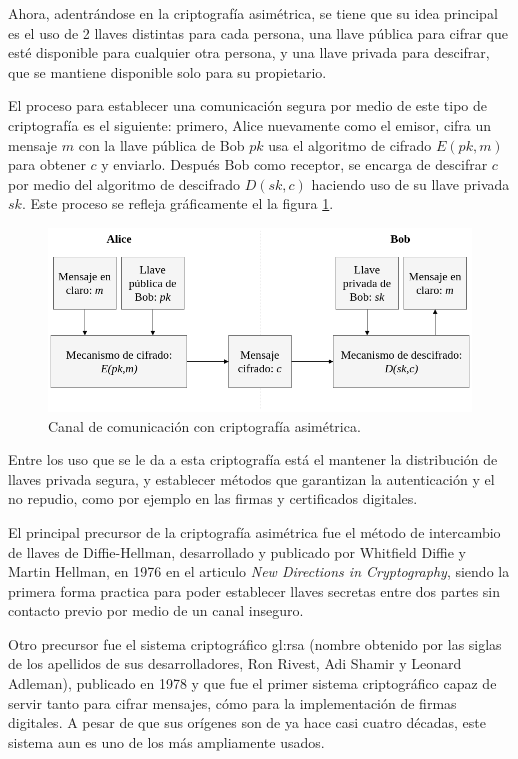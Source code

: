   Ahora, adentrándose en la criptografía asimétrica, se tiene que su idea
  principal es el uso de 2 llaves distintas para cada persona, una llave
  pública para cifrar que esté disponible para cualquier otra persona, y una
  llave privada para descifrar, que se mantiene disponible solo para su
  propietario.

  El proceso para establecer una comunicación segura por medio de este tipo
  de criptografía es el siguiente: primero, Alice nuevamente como el emisor,
  cifra un mensaje $m$ con la llave pública de Bob $pk$ usa el algoritmo de
  cifrado $E(pk,m)$ para obtener $c$ y enviarlo. Después Bob como receptor,
  se encarga de descifrar $c$ por medio del algoritmo de descifrado
  $D(sk,c)$ haciendo uso de su llave privada $sk$. Este proceso se refleja
  gráficamente el la figura \ref{cripto_asimetrica}.

  \begin{figure}[H]
    \begin{center}
      \includegraphics[width=0.8\linewidth]
        {contenidos/antecedentes/intro/img/cripto_asimetrica.png}
      \caption{Canal de comunicación con criptografía asimétrica.}
      \label{cripto_asimetrica}
    \end{center}
  \end{figure}

  Entre los uso que se le da a esta criptografía está el mantener la
  distribución de llaves privada segura, y establecer métodos que garantizan
  la autenticación y el no repudio, como por ejemplo en las firmas y
  certificados digitales.

  El principal precursor de la criptografía asimétrica fue el método de 
  intercambio de llaves de Diffie-Hellman, desarrollado y publicado por 
  Whitfield Diffie y Martin Hellman, en 1976 en el articulo \textit{New 
  Directions in Cryptography}, siendo la primera forma practica para poder 
  establecer llaves secretas entre dos partes sin contacto previo por medio 
  de un canal inseguro.

  Otro precursor fue el sistema criptográfico \acrshort{gl:rsa} (nombre 
  obtenido por las siglas de los apellidos de sus desarrolladores, Ron Rivest, 
  Adi Shamir y Leonard Adleman), publicado en 1978 y que fue el primer sistema 
  criptográfico capaz de servir tanto para cifrar mensajes, cómo para la 
  implementación de firmas digitales. A pesar de que sus orígenes son de ya 
  hace casi cuatro décadas, este sistema aun es uno de los más ampliamente 
  usados.

